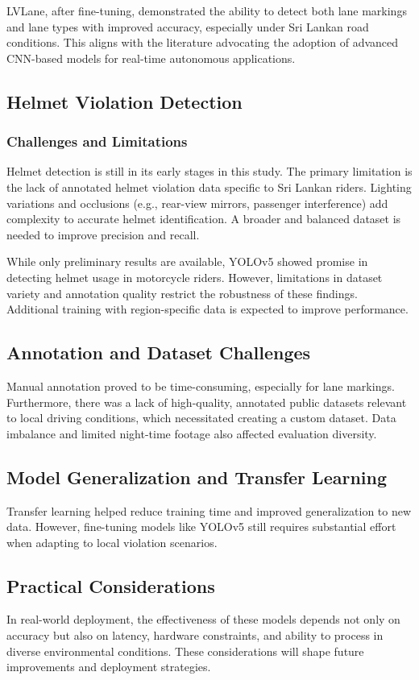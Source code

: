 \documentclass[12pt,a4paper]{article}
\begin{document}
LVLane, after fine-tuning, demonstrated the ability to detect both lane markings and lane types with improved accuracy, especially under Sri Lankan road conditions. This aligns with the literature advocating the adoption of advanced CNN-based models for real-time autonomous applications.

\subsection{Helmet Violation Detection}
\subsubsection{Challenges and Limitations}
Helmet detection is still in its early stages in this study. The primary limitation is the lack of annotated helmet violation data specific to Sri Lankan riders. Lighting variations and occlusions (e.g., rear-view mirrors, passenger interference) add complexity to accurate helmet identification. A broader and balanced dataset is needed to improve precision and recall.

While only preliminary results are available, YOLOv5 showed promise in detecting helmet usage in motorcycle riders. However, limitations in dataset variety and annotation quality restrict the robustness of these findings. Additional training with region-specific data is expected to improve performance.

\subsection{Annotation and Dataset Challenges}
Manual annotation proved to be time-consuming, especially for lane markings. Furthermore, there was a lack of high-quality, annotated public datasets relevant to local driving conditions, which necessitated creating a custom dataset. Data imbalance and limited night-time footage also affected evaluation diversity.

\subsection{Model Generalization and Transfer Learning}
Transfer learning helped reduce training time and improved generalization to new data. However, fine-tuning models like YOLOv5 still requires substantial effort when adapting to local violation scenarios.

\subsection{Practical Considerations}
In real-world deployment, the effectiveness of these models depends not only on accuracy but also on latency, hardware constraints, and ability to process in diverse environmental conditions. These considerations will shape future improvements and deployment strategies.
\end{document}
